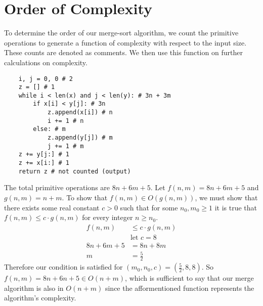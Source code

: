 \documentclass{article}
\begin{document}
\section{Order of Complexity}
To determine the order of our merge-sort algorithm, we count the primitive operations 
to generate a function of complexity with respect to the input size. These counts
are denoted as comments. We then use this function on further calculations on complexity. 
\begin{lstlisting}
    i, j = 0, 0 # 2
    z = [] # 1
    while i < len(x) and j < len(y): # 3n + 3m
        if x[i] < y[j]: # 3n
            z.append(x[i]) # n
            i += 1 # n
        else: # m
            z.append(y[j]) # m
            j += 1 # m
    z += y[j:] # 1
    z += x[i:] # 1
    return z # not counted (output)
\end{lstlisting}
The total primitive operations are  $8n + 6m + 5$. Let $f(n,m) = 8n + 6m + 5$ and 
$g(n,m) = n + m$. To show that $f(n,m) \in O(g(n,m))$, we must show that there exists 
some real constant $c > 0$ such that for some $n_0,m_0 \geq 1$ it is true that 
$f(n,m) \leq c \cdot g(n,m)$ for every integer $n \geq n_0$. 
\begin{align*}
    f(n,m) &\leq c \cdot g(n,m) \\
   &\text{let } c = 8 \\
    8n + 6m + 5 &= 8n + 8m \\
    m &= \frac 5 2 
\end{align*}
Therefore our condition is satisfied for $(m_0, n_0, c) = (\frac 5 2, 8, 8)$.
So $f(n,m) = 8n + 6n + 5 \in O(n +m)$, which is sufficient to say that our merge 
algorithm is also in $O(n+m)$ since the afformentioned function represents the 
algorithm's complexity. 
\end{document}

